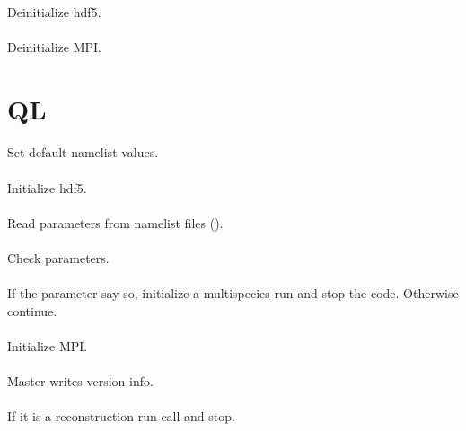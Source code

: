\paragraph{}
Deinitialize hdf5.

\paragraph{}
Deinitialize MPI.

\section{QL}

\paragraph{}
Set default namelist values.

\paragraph{}
Initialize hdf5.

\paragraph{}
Read parameters from namelist files ().

\paragraph{}
Check parameters.

\paragraph{}
If the parameter say so, initialize a multispecies run and stop the
code.
Otherwise continue.

\paragraph{}
Initialize MPI.

\paragraph{}
Master writes version info.

\paragraph{}
If it is a reconstruction run call 
and stop.

